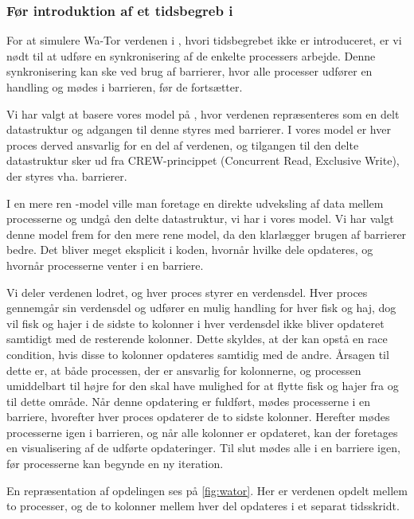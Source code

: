 \subsubsection{Før introduktion af et tidsbegreb i \pycsp}
For at simulere Wa-Tor verdenen i \pycsp, hvori tidsbegrebet ikke er introduceret, er vi nødt 
til at udføre en synkronisering af de enkelte processers arbejde. Denne 
synkronisering kan ske ved brug af barrierer, hvor alle processer udfører en 
handling og mødes i barrieren, før de fortsætter.

Vi har valgt at basere vores model på \cite{crew}, hvor verdenen repræsenteres 
som en delt datastruktur og adgangen til denne styres med barrierer. I vores 
model er hver proces derved ansvarlig for en del af verdenen, og tilgangen til 
den delte datastruktur sker ud fra CREW-princippet (Concurrent Read, Exclusive 
Write)\cite[5]{crew}, der styres vha. barrierer.  

I en mere ren \csp-model ville man foretage en direkte udveksling af data mellem 
processerne og undgå den delte datastruktur, vi har i vores model.  Vi har 
valgt denne model frem for den mere rene \csp model, da den klarlægger brugen af 
barrierer bedre.  Det bliver meget eksplicit i koden, hvornår hvilke dele 
opdateres, og hvornår processerne venter i en barriere.

Vi deler verdenen lodret, og hver proces styrer en verdensdel. Hver proces 
gennemgår sin verdensdel og udfører en mulig handling for hver fisk og haj, dog 
vil fisk og hajer i de sidste to kolonner i hver verdensdel ikke bliver 
opdateret samtidigt med de resterende kolonner. Dette skyldes, at der kan opstå en race 
condition, hvis disse to kolonner opdateres samtidig med de andre. Årsagen til 
dette er, at både processen, der er ansvarlig for kolonnerne, og processen 
umiddelbart til højre for den skal have mulighed for at flytte fisk og hajer fra og til dette område. 
Når denne 
opdatering er fuldført, mødes processerne i en barriere, hvorefter hver proces 
opdaterer de to sidste kolonner. Herefter mødes processerne igen i barrieren, 
og når alle kolonner er opdateret, kan der foretages en visualisering af de 
udførte opdateringer. Til slut mødes alle i en barriere igen, før processerne 
kan begynde en ny iteration.

En repræsentation af opdelingen ses på \cref{fig:wator}. Her er verdenen 
opdelt mellem to processer, og de to kolonner mellem hver del opdateres i et 
separat tidsskridt.  


